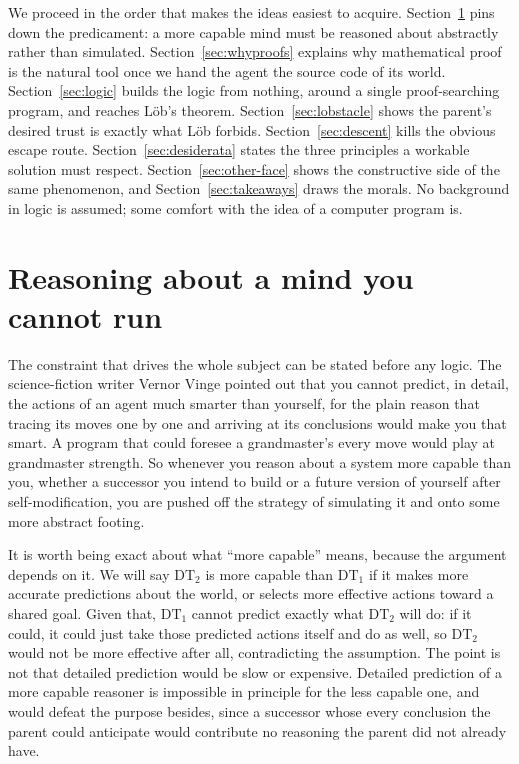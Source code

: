 \documentclass[10pt]{article}
\theoremstyle{definition}
\theoremstyle{remark}
\begin{document}
We proceed in the order that makes the ideas easiest to acquire. Section~\ref{sec:vingean} pins down the predicament: a more capable mind must be reasoned about abstractly rather than simulated. Section~\ref{sec:whyproofs} explains why mathematical proof is the natural tool once we hand the agent the source code of its world. Section~\ref{sec:logic} builds the logic from nothing, around a single proof-searching program, and reaches L\"ob's theorem. Section~\ref{sec:lobstacle} shows the parent's desired trust is exactly what L\"ob forbids. Section~\ref{sec:descent} kills the obvious escape route. Section~\ref{sec:desiderata} states the three principles a workable solution must respect. Section~\ref{sec:other-face} shows the constructive side of the same phenomenon, and Section~\ref{sec:takeaways} draws the morals. No background in logic is assumed; some comfort with the idea of a computer program is.

\section{Reasoning about a mind you cannot run}
\label{sec:vingean}

The constraint that drives the whole subject can be stated before any logic. The science-fiction writer Vernor Vinge pointed out that you cannot predict, in detail, the actions of an agent much smarter than yourself, for the plain reason that tracing its moves one by one and arriving at its conclusions would make you that smart. A program that could foresee a grandmaster's every move would play at grandmaster strength. So whenever you reason about a system more capable than you, whether a successor you intend to build or a future version of yourself after self-modification, you are pushed off the strategy of simulating it and onto some more abstract footing.

It is worth being exact about what ``more capable'' means, because the argument depends on it. We will say $\mathrm{DT}_2$ is more capable than $\mathrm{DT}_1$ if it makes more accurate predictions about the world, or selects more effective actions toward a shared goal. Given that, $\mathrm{DT}_1$ cannot predict exactly what $\mathrm{DT}_2$ will do: if it could, it could just take those predicted actions itself and do as well, so $\mathrm{DT}_2$ would not be more effective after all, contradicting the assumption. The point is not that detailed prediction would be slow or expensive. Detailed prediction of a more capable reasoner is impossible in principle for the less capable one, and would defeat the purpose besides, since a successor whose every conclusion the parent could anticipate would contribute no reasoning the parent did not already have.
\end{document}
